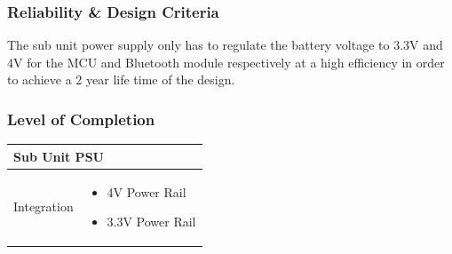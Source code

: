 \subsubsection{Reliability \& Design Criteria}
The sub unit power supply only has to regulate the battery voltage to 3.3\si{\V} and 4\si{\V} for the MCU and Bluetooth module respectively at a high efficiency in order to achieve a 2 year life time of the design.
\subsubsection{Level of Completion}
\begin{table}[!ht]
  \begin{tabularx}{\textwidth}{|X|X|}
    \hline
    \multicolumn{2}{|X|}{Sub Unit PSU}\\
    \hline
    Integration&\begin{itemize}
                  \item 4\si{\V} Power Rail
                  \item 3.3\si{\V} Power Rail
                \end{itemize}\\
    \hline
  \end{tabularx}
\end{table}
